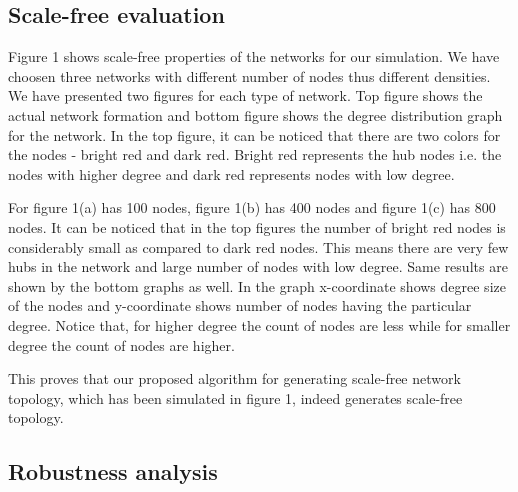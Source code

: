 \documentclass{article}
\begin{document}
\subsection{Scale-free evaluation}
Figure 1 shows scale-free properties of the networks for our simulation. We have choosen three networks with different number of nodes thus different densities. We have presented two figures for each type of network. Top figure shows the actual network formation and bottom figure shows the degree distribution graph for the network. In the top figure, it can be noticed that there are two colors for the nodes - bright red and dark red. Bright red represents the hub nodes i.e. the nodes with higher degree and dark red represents nodes with low degree. 

For figure 1(a) has 100 nodes, figure 1(b) has 400 nodes and figure 1(c) has 800 nodes. It can be noticed that in the top figures the number of bright red nodes is considerably small as compared to dark red nodes. This means there are very few hubs in the network and large number of nodes with low degree. Same results are shown by the bottom graphs as well. In the graph x-coordinate shows degree size of the nodes and y-coordinate shows number of nodes having the particular degree. Notice that, for higher degree the count of nodes are less while for smaller degree the count of nodes are higher.

This proves that our proposed algorithm for generating scale-free network topology, which has been simulated in figure 1, indeed generates scale-free topology.

\subsection{Robustness analysis}
\end{document}

